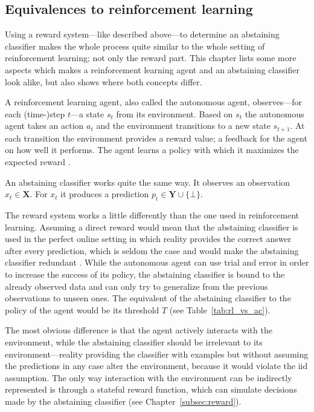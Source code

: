 \documentclass[twoside,11pt]{article}
\def\X{\textbf{X}}
\def\Y{\textbf{Y}}
\begin{document}

\subsection{Equivalences to reinforcement learning}

Using a reward system---like described above---to determine
an abstaining classifier makes the whole process quite
similar to the whole setting of reinforcement learning; not
only the reward part. This chapter lists some more aspects
which makes a reinforcement learning agent and an
abstaining classifier look alike, but also shows where
both concepts differ.

A reinforcement learning agent, also called the autonomous
agent, observes---for each (time-)step $t$---a state $s_t$
from its environment.
Based on $s_t$ the autonomous agent takes an action $a_t$
and the environment transitions to a new state $s_{t+1}$.
At each transition the environment provides a reward
value; a feedback for the agent on how well it performs.
The agent learns a policy with which it maximizes the
expected reward \citep[see][]{arulkumaran_et_al_2017}.

An abstaining classifier works quite the same way.
It observes an observation $x_t \in \X$.
For $x_t$ it produces a prediction $p_t \in \Y \cup
\{\bot\}$.

The reward system works a little differently than the one
used in reinforcement learning. Assuming a direct reward
would mean that the abstaining classifier is used in the
perfect online setting in which reality provides the
correct answer after every prediction, which is seldom the
case and would make the abstaining classifier redundant
\citep[see][Chapter 4.3]{alrw}.
While the autonomous agent can use trial and error in order
to increase the success of its policy, the abstaining
classifier is bound to the already observed data and can
only try to generalize from the previous observations to
unseen ones.
The equivalent of the abstaining classifier to the policy
of the agent would be its threshold $T$ (see
Table~\ref{tab:rl_vs_ac}).

The most obvious difference is that the agent actively
interacts with the environment, while the abstaining
classifier should be irrelevant to its
environment---reality providing the classifier with
examples but without assuming the predictions in any case
alter the environment, because it would violate the iid
assumption. The only way interaction with the
environment can be indirectly represented is through a
stateful reward function, which can simulate decisions made
by the abstaining classifier
(see Chapter~\ref{subsec:reward}).
\end{document}
